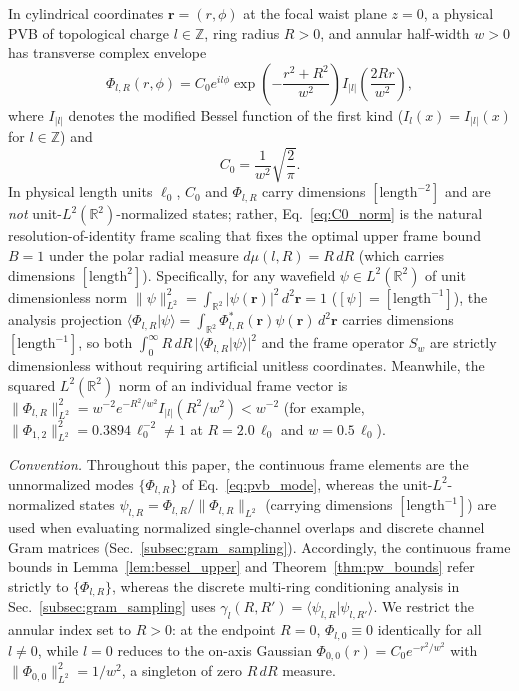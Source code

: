 \documentclass[aps,pra,reprint,nofootinbib,floatfix,longbibliography]{revtex4-2}
\theoremstyle{remark}
\newcommand{\braket}[2]{\langle #1 | #2 \rangle}
\newcommand{\norm}[1]{\lVert #1 \rVert}
\newcommand{\abs}[1]{\lvert #1 \rvert}
\begin{document}
In cylindrical coordinates $\mathbf{r} = (r,\phi)$ at the focal waist plane $z = 0$, a physical PVB of topological charge $l \in \mathbb{Z}$, ring radius $R > 0$, and annular half-width $w > 0$ has transverse complex envelope~\cite{Ostrovsky2013,Vaity2015}
\begin{equation}
\Phi_{l,R}(r,\phi) = C_0 e^{il\phi} \exp\!\left(-\frac{r^2 + R^2}{w^2}\right) I_{\abs{l}}\!\left(\frac{2Rr}{w^2}\right),
\label{eq:pvb_mode}
\end{equation}
where $I_{\abs{l}}$ denotes the modified Bessel function of the first kind ($I_l(x) = I_{\abs{l}}(x)$ for $l \in \mathbb{Z}$) and
\begin{equation}
C_0 = \frac{1}{w^2}\sqrt{\frac{2}{\pi}}.
\label{eq:C0_norm}
\end{equation}
In physical length units $\ell_0$, $C_0$ and $\Phi_{l,R}$ carry dimensions $[\mathrm{length}^{-2}]$ and are \emph{not} unit-$L^2(\mathbb{R}^2)$-normalized states; rather, Eq.~\eqref{eq:C0_norm} is the natural resolution-of-identity frame scaling that fixes the optimal upper frame bound $B = 1$ under the polar radial measure $d\mu(l,R) = R\,dR$ (which carries dimensions $[\mathrm{length}^2]$). Specifically, for any wavefield $\psi \in L^2(\mathbb{R}^2)$ of unit dimensionless norm $\norm{\psi}_{L^2}^2 = \int_{\mathbb{R}^2}\abs{\psi(\mathbf{r})}^2\,d^2\mathbf{r} = 1$ ($[\psi] = [\mathrm{length}^{-1}]$), the analysis projection $\braket{\Phi_{l,R}}{\psi} = \int_{\mathbb{R}^2}\Phi_{l,R}^*(\mathbf{r})\psi(\mathbf{r})\,d^2\mathbf{r}$ carries dimensions $[\mathrm{length}^{-1}]$, so both $\int_0^\infty R\,dR\,\abs{\braket{\Phi_{l,R}}{\psi}}^2$ and the frame operator $S_w$ are strictly dimensionless without requiring artificial unitless coordinates. Meanwhile, the squared $L^2(\mathbb{R}^2)$ norm of an individual frame vector is $\norm{\Phi_{l,R}}_{L^2}^2 = w^{-2} e^{-R^2/w^2} I_{\abs{l}}(R^2/w^2) < w^{-2}$ (for example, $\norm{\Phi_{1,2}}_{L^2}^2 = 0.3894\,\ell_0^{-2} \neq 1$ at $R = 2.0\,\ell_0$ and $w = 0.5\,\ell_0$).

\emph{Convention.} Throughout this paper, the continuous frame elements are the unnormalized modes $\{\Phi_{l,R}\}$ of Eq.~\eqref{eq:pvb_mode}, whereas the unit-$L^2$-normalized states $\psi_{l,R} = \Phi_{l,R}/\norm{\Phi_{l,R}}_{L^2}$ (carrying dimensions $[\mathrm{length}^{-1}]$) are used when evaluating normalized single-channel overlaps and discrete channel Gram matrices (Sec.~\ref{subsec:gram_sampling}). Accordingly, the continuous frame bounds in Lemma~\ref{lem:bessel_upper} and Theorem~\ref{thm:pw_bounds} refer strictly to $\{\Phi_{l,R}\}$, whereas the discrete multi-ring conditioning analysis in Sec.~\ref{subsec:gram_sampling} uses $\gamma_l(R,R') = \braket{\psi_{l,R}}{\psi_{l,R'}}$. We restrict the annular index set to $R > 0$: at the endpoint $R = 0$, $\Phi_{l,0} \equiv 0$ identically for all $l \neq 0$, while $l = 0$ reduces to the on-axis Gaussian $\Phi_{0,0}(r) = C_0 e^{-r^2/w^2}$ with $\norm{\Phi_{0,0}}_{L^2}^2 = 1/w^2$, a singleton of zero $R\,dR$ measure.
\end{document}
